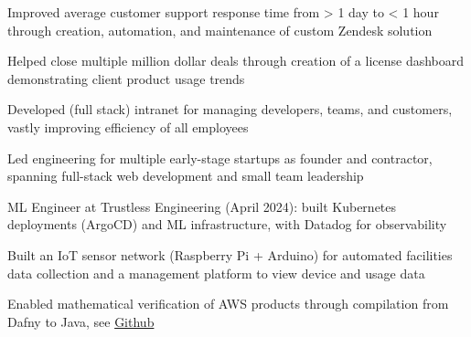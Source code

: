 \documentclass[]{jack-resume}
\begin{document}
\begin{tightemize}
    \item Improved average customer support response time from > 1 day to < 1 hour through creation, automation, and maintenance of custom Zendesk solution
    \item Helped close multiple million dollar deals through creation of a license dashboard demonstrating client product usage trends
    \item Developed (full stack) intranet for managing developers, teams, and customers, vastly improving efficiency of all employees
\end{tightemize}
\sectionsep

\begin{tightemize}
    \item Led engineering for multiple early-stage startups as founder and contractor, spanning full-stack web development and small team leadership
    \item ML Engineer at Trustless Engineering (April 2024): built Kubernetes deployments (ArgoCD) and ML infrastructure, with Datadog for observability
\end{tightemize}
\sectionsep

\begin{tightemize}
    \item Built an IoT sensor network (Raspberry Pi + Arduino) for automated facilities data collection and a management platform to view device and usage data
\end{tightemize}

\begin{tightemize}
    \item Enabled mathematical verification of AWS products through compilation from Dafny to Java, see \href{https://github.com/dafny-lang/dafny}{Github \ExternalLink}
\end{tightemize}
\sectionsep
\end{document}
